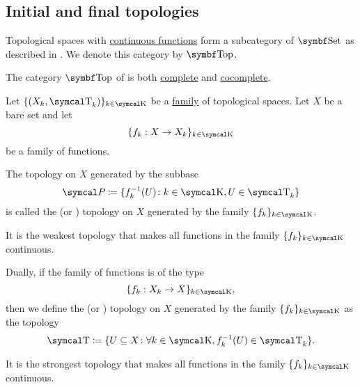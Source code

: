 \subsection{Initial and final topologies}\label{subsec:initial_final_topologies}

\begin{definition}\label{def:category_of_topological_spaces}
  Topological spaces with \hyperref[def:global_continuity]{continuous functions} form a subcategory of \( \Cat{Set} \) as described in . We denote this category by \( \Cat{Top} \).
\end{definition}

\begin{theorem}\label{thm:top_complete_cocomplete}
  The category \( \Cat{Top} \) of is both \hyperref[def:categorical_limit]{complete} and \hyperref[def:categorical_colimit]{cocomplete}.
\end{theorem}

\begin{definition}\label{def:initial_topology}
  Let \( \{ (X_k, \CT_k) \}_{k \in \CK} \) be a \hyperref[def:indexed_family]{family} of topological spaces. Let \( X \) be a bare set and let
  \begin{equation*}
    \{ f_k: X \to X_k \}_{k \in \CK}
  \end{equation*}
  be a family of functions.

  The topology on \( X \) generated by the subbase
  \begin{equation*}
    \Cal{P} \coloneqq \{ f_k^{-1}(U) \colon k \in \CK, U \in \CT_k \}
  \end{equation*}
  is called the  (or ) topology on \( X \) generated by the family \( \{ f_k \}_{k \in \CK} \).

  It is the weakest topology that makes all functions in the family \( \{ f_k \}_{k \in \CK} \) continuous.
\end{definition}

\begin{definition}\label{def:final_topology}
  Dually, if the family of functions is of the type
  \begin{equation*}
    \{ f_k: X_k \to X \}_{k \in \CK},
  \end{equation*}
  then we define the  (or ) topology on \( X \) generated by the family \( \{ f_k \}_{k \in \CK} \) as the topology
  \begin{equation*}
    \CT \coloneqq \{ U \subseteq X \colon \forall k \in \CK, f_k^{-1}(U) \in \CT_k \}.
  \end{equation*}

  It is the strongest topology that makes all functions in the family \( \{ f_k \}_{k \in \CK} \) continuous.
\end{definition}

